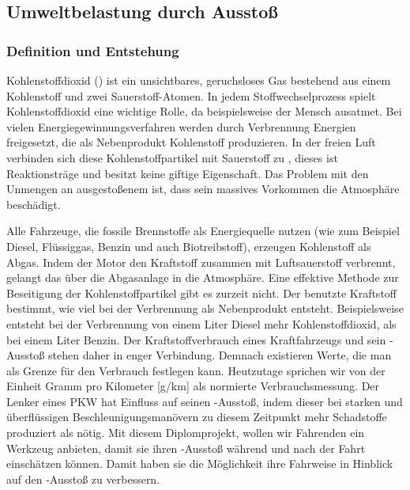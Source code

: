\subsection{Umweltbelastung durch  Ausstoß}
\label{subsec:umweltbelastungco2}

\subsubsection{Definition und Entstehung}
Kohlenstoffdioxid () ist ein unsichtbares, geruchsloses Gas bestehend aus einem Kohlenstoff und zwei Sauerstoff-Atomen. 
In jedem Stoffwechselprozess spielt Kohlenstoffdioxid eine wichtige Rolle, da beispielsweise der Mensch  ausatmet. 
Bei vielen Energiegewinnungsverfahren werden durch Verbrennung Energien freigesetzt, die als Nebenprodukt Kohlenstoff produzieren. 
In der freien Luft verbinden sich diese Kohlenstoffpartikel mit Sauerstoff zu , dieses ist
Reaktionsträge und besitzt keine giftige Eigenschaft. 
Das Problem mit den Unmengen an ausgestoßenem  ist, dass sein massives Vorkommen die Atmosphäre beschädigt.

Alle Fahrzeuge, die fossile Brennstoffe als Energiequelle nutzen 
(wie zum Beispiel Diesel, Flüssiggas, Benzin und auch Biotreibstoff), erzeugen Kohlenstoff als Abgas. 
Indem der Motor den Kraftstoff zusammen mit Luftsauerstoff verbrennt, gelangt das  über die Abgasanlage in die Atmosphäre. 
Eine effektive Methode zur Beseitigung der Kohlenstoffpartikel gibt es zurzeit nicht. 
Der benutzte Kraftstoff bestimmt, wie viel  bei der Verbrennung als Nebenprodukt entsteht.
Beispielsweise entsteht bei der Verbrennung von einem Liter Diesel mehr Kohlenstoffdioxid, als bei einem Liter Benzin.
Der Kraftstoffverbrauch eines Kraftfahrzeugs und sein -Ausstoß stehen daher in enger Verbindung.
Demnach existieren Werte, die man als Grenze für den Verbrauch festlegen kann. 
Heutzutage sprichen wir von der Einheit Gramm pro Kilometer [g/km] als normierte Verbrauchsmessung.
Der Lenker eines PKW hat Einfluss auf seinen -Ausstoß, indem dieser bei starken und überflüssigen Beschleunigungsmanövern
zu diesem Zeitpunkt mehr Schadstoffe produziert als nötig.
Mit diesem Diplomprojekt, wollen wir Fahrenden ein Werkzeug anbieten, damit sie ihren -Ausstoß während und nach der Fahrt
einschätzen können. Damit haben sie die Möglichkeit ihre Fahrweise in Hinblick auf den -Ausstoß zu verbessern.

\clearpage

